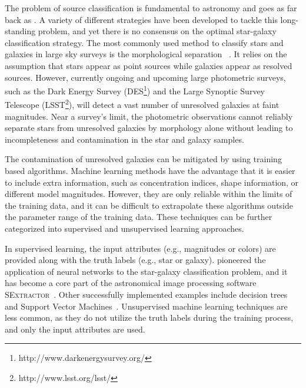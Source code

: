 \documentclass[useAMS,usenatbib]{mn2e}
\newcommand{\eg}{{e.g., }}
\begin{document}
The problem of source classification is fundamental to astronomy
and goes as far back as \citet{messier1781catalogue}.
A variety of different strategies have been developed 
to tackle this long-standing problem,
and yet there is no consensus on
the optimal star-galaxy classification strategy.
The most commonly used method to classify stars and galaxies
in large sky surveys is the morphological separation
~\citep{sebok1979optimal, kron1980photometry, valdes1982resolution,
yee1991faint, vasconcellos2011decision,
henrion2011bayesian}.
It relies on the assumption that
stars appear as point sources
while galaxies appear as resolved sources.
However,
currently ongoing and upcoming large photometric surveys,
such as the Dark Energy Survey
(DES\footnote{http://www.darkenergysurvey.org/})
and the Large Synoptic Survey Telescope
(LSST\footnote{http://www.lsst.org/lsst/}),
will detect a vast number of unresolved galaxies
at faint magnitudes.
Near a survey's limit, the photometric observations
cannot reliably separate stars from unresolved galaxies
by morphology alone without leading to
incompleteness and contamination in the star and galaxy samples.

The contamination of unresolved galaxies can be mitigated
by using training based algorithms.
Machine learning methods have the advantage that
it is easier to include extra information,
such as concentration indices, shape information,
or different model magnitudes.
However,
they are only reliable within the limits of the training data,
and it can be difficult to extrapolate these algorithms
outside the parameter range of the training data.
These techniques can be further categorized into
supervised and unsupervised learning approaches.

In supervised learning, 
the input attributes (\eg magnitudes or colors)
are provided along with the truth labels (\eg star or galaxy).
\citet{odewahn1992automated} pioneered
the application of neural networks
to the star-galaxy classification problem,
and it has become a core part of
the astronomical image processing software
\textsc{SExtractor}~\citep{bertin1996sextractor}.
Other successfully implemented examples include
decision trees~\citep{weir1995automated, suchkov2005census, ball2006robust,
sevilla2015effect}
and Support Vector Machines~\citep*{Fadely2012}.
Unsupervised machine learning techniques
are less common,
as they do not utilize the truth labels during the training process,
and only the input attributes are used.
\end{document}
